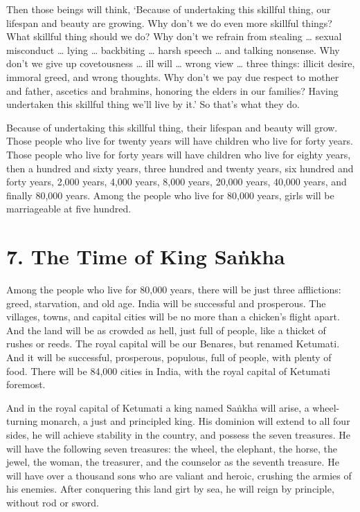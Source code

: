 \documentclass[12pt,openany]{book}%
\begin{document}
Then those beings will think, ‘Because of undertaking this skillful thing, our lifespan and beauty are growing. Why don’t we do even more skillful things? What skillful thing should we do? Why don’t we refrain from stealing … sexual misconduct … lying … backbiting … harsh speech … and talking nonsense. Why don’t we give up covetousness … ill will … wrong view … three things: illicit desire, immoral greed, and wrong thoughts. Why don’t we pay due respect to mother and father, ascetics and brahmins, honoring the elders in our families? Having undertaken this skillful thing we’ll live by it.’ So that’s what they do. 

Because of undertaking this skillful thing, their lifespan and beauty will grow. Those people who live for twenty years will have children who live for forty years. Those people who live for forty years will have children who live for eighty years, then a hundred and sixty years, three hundred and twenty years, six hundred and forty years, 2,000 years, 4,000 years, 8,000 years, 20,000 years, 40,000 years, and finally 80,000 years. Among the people who live for 80,000 years, girls will be marriageable at five hundred. 

\section*{7. The Time of King \textsanskrit{Saṅkha} }

Among the people who live for 80,000 years, there will be just three afflictions: greed, starvation, and old age. India will be successful and prosperous. The villages, towns, and capital cities will be no more than a chicken’s flight apart. And the land will be as crowded as hell, just full of people, like a thicket of rushes or reeds. The royal capital will be our Benares, but renamed Ketumati. And it will be successful, prosperous, populous, full of people, with plenty of food. There will be 84,000 cities in India, with the royal capital of Ketumati foremost. 

And in the royal capital of Ketumati a king named \textsanskrit{Saṅkha} will arise, a wheel-turning monarch, a just and principled king. His dominion will extend to all four sides, he will achieve stability in the country, and possess the seven treasures. He will have the following seven treasures: the wheel, the elephant, the horse, the jewel, the woman, the treasurer, and the counselor as the seventh treasure. He will have over a thousand sons who are valiant and heroic, crushing the armies of his enemies. After conquering this land girt by sea, he will reign by principle, without rod or sword. 
\end{document}
